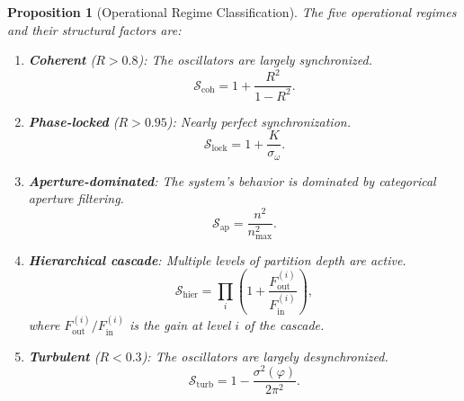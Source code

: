 \documentclass[twocolumn,10pt]{article}
\newtheorem{proposition}[theorem]{Proposition}
\theoremstyle{remark}
\begin{document}
\begin{proposition}[Operational Regime Classification]
\label{prop:regimes}
The five operational regimes and their structural factors are:
\begin{enumerate}[label=(\roman*)]
    \item \textbf{Coherent} ($R > 0.8$): The oscillators are largely synchronized.
    \begin{equation}
    \mathcal{S}_{\mathrm{coh}} = 1 + \frac{R^2}{1 - R^2}.
    \label{eq:S_coherent}
    \end{equation}

    \item \textbf{Phase-locked} ($R > 0.95$): Nearly perfect synchronization.
    \begin{equation}
    \mathcal{S}_{\mathrm{lock}} = 1 + \frac{K}{\sigma_\omega}.
    \label{eq:S_locked}
    \end{equation}

    \item \textbf{Aperture-dominated}: The system's behavior is dominated by categorical aperture filtering.
    \begin{equation}
    \mathcal{S}_{\mathrm{ap}} = \frac{n^2}{n_{\max}^2}.
    \label{eq:S_aperture}
    \end{equation}

    \item \textbf{Hierarchical cascade}: Multiple levels of partition depth are active.
    \begin{equation}
    \mathcal{S}_{\mathrm{hier}} = \prod_{i}\left(1 + \frac{F_{\mathrm{out}}^{(i)}}{F_{\mathrm{in}}^{(i)}}\right),
    \label{eq:S_hierarchical}
    \end{equation}
    where $F_{\mathrm{out}}^{(i)}/F_{\mathrm{in}}^{(i)}$ is the gain at level $i$ of the cascade.

    \item \textbf{Turbulent} ($R < 0.3$): The oscillators are largely desynchronized.
    \begin{equation}
    \mathcal{S}_{\mathrm{turb}} = 1 - \frac{\sigma^2(\varphi)}{2\pi^2}.
    \label{eq:S_turbulent}
    \end{equation}
\end{enumerate}
\end{proposition}
\end{document}
